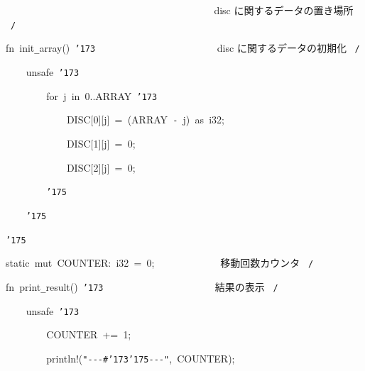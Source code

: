\documentclass{article}
\begin{document}
\noindent
\mbox{}{\tt\mc \ \ \ \ \ \ \ \ }{\tt\mc \ \ \ \ \ \ \ \ }{\tt\mc \ \ \ \ \ \ \ \ }{\tt\mc \ \ \ \ \ \ \ \ }{\tt\mc \ \ \ \ \ \ \ \ }\rm\mc {\tt /}{\tt *}\  {}disc に関するデータの置き場所
					   \hfill \rm\mc \ {\tt *}{\tt /}
\tt\mc 

\noindent
\mbox{}\hfill

\noindent
\mbox{}fn{\tt\mc \ }init{\tt\_}array(){\tt\mc \ }{\tt\char'173}{\tt\mc \ \ \ \ \ \ \ }{\tt\mc \ \ \ \ \ \ \ \ }{\tt\mc \ \ \ \ \ \ \ \ }\rm\mc {\tt /}{\tt *}\  {}disc に関するデータの初期化
					   \hfill \rm\mc \ {\tt *}{\tt /}
\tt\mc 

\noindent
\mbox{}{\tt\mc \ \ \ \ }unsafe{\tt\mc \ }{\tt\char'173}

\noindent
\mbox{}{\tt\mc \ \ \ \ \ \ \ \ }for{\tt\mc \ }j{\tt\mc \ }in{\tt\mc \ }0..ARRAY{\tt\mc \ }{\tt\char'173}

\noindent
\mbox{}{\tt\mc \ \ \ \ \ \ \ \ \ \ \ \ }DISC[0][j]{\tt\mc \ }={\tt\mc \ }(ARRAY{\tt\mc \ }{\tt -}{\tt\mc \ }j){\tt\mc \ }as{\tt\mc \ }i32;

\noindent
\mbox{}{\tt\mc \ \ \ \ \ \ \ \ \ \ \ \ }DISC[1][j]{\tt\mc \ }={\tt\mc \ }0;

\noindent
\mbox{}{\tt\mc \ \ \ \ \ \ \ \ \ \ \ \ }DISC[2][j]{\tt\mc \ }={\tt\mc \ }0;

\noindent
\mbox{}{\tt\mc \ \ \ \ \ \ \ \ }{\tt\char'175}

\noindent
\mbox{}{\tt\mc \ \ \ \ }{\tt\char'175}

\noindent
\mbox{}{\tt\char'175}

\noindent
\mbox{}\hfill

\noindent
\mbox{}static{\tt\mc \ }mut{\tt\mc \ }COUNTER:{\tt\mc \ }i32{\tt\mc \ }={\tt\mc \ }0;{\tt\mc \ \ \ \ }{\tt\mc \ \ \ \ \ \ \ \ }\rm\mc {\tt /}{\tt *}\  {}移動回数カウンタ \hfill \rm\mc \ {\tt *}{\tt /}
\tt\mc 

\noindent
\mbox{}\hfill

\noindent
\mbox{}fn{\tt\mc \ }print{\tt\_}result(){\tt\mc \ }{\tt\char'173}{\tt\mc \ \ \ \ \ }{\tt\mc \ \ \ \ \ \ \ \ }{\tt\mc \ \ \ \ \ \ \ \ }\rm\mc {\tt /}{\tt *}\  {}結果の表示 \hfill \rm\mc \ {\tt *}{\tt /}
\tt\mc 

\noindent
\mbox{}{\tt\mc \ \ \ \ }unsafe{\tt\mc \ }{\tt\char'173}

\noindent
\mbox{}{\tt\mc \ \ \ \ \ \ \ \ }COUNTER{\tt\mc \ }+={\tt\mc \ }1;

\noindent
\mbox{}{\tt\mc \ \ \ \ \ \ \ \ }println!({\tt "}{\tt -}{\tt -}{\tt -}{\tt\#}{\tt\char'173}{\tt\char'175}{\tt -}{\tt -}{\tt -}{\tt "},{\tt\mc \ }COUNTER);
\end{document}
